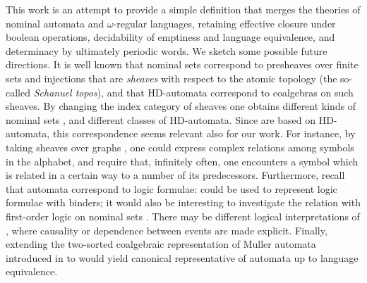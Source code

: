 This work is an attempt to provide a simple definition that merges the theories of nominal automata and $\omega$-regular languages, retaining effective closure under boolean operations, decidability of emptiness and language equivalence, and determinacy by ultimately periodic words. We sketch some possible future directions. It is well known that nominal sets correspond to presheaves over finite sets and injections that are \emph{sheaves} with respect to the atomic topology (the so-called \emph{Schanuel topos}), and that HD-automata correspond to coalgebras on such sheaves. By changing the index category of sheaves one obtains different kinds of nominal sets \cite{CianciaKM10}, and different classes of HD-automata. Since \hdmas{} are based on HD-automata, this correspondence seems relevant also for our work. For instance, by taking sheaves over graphs \cite{SammartinoPhD}, one could express complex relations among symbols in the alphabet, and require that, infinitely often, one encounters a symbol which is related in a certain way to a number of its predecessors. Furthermore, recall that automata correspond to logic formulae: \hdmas{} could be used to represent logic formulae with binders; it would also be interesting to investigate the relation with first-order logic on nominal sets \cite{Bojanczyk13}. There may be different logical interpretations of \hdmas, where causality or dependence \cite{Vnnen07,Galliani12} between events are made explicit. Finally, extending the two-sorted coalgebraic representation of Muller automata introduced in \cite{CianciaV12} to \hdmas{} would yield canonical representative of automata up to language equivalence.






